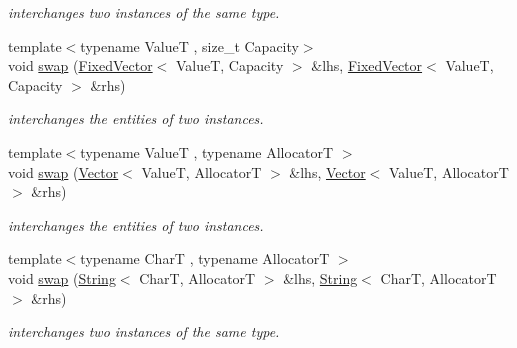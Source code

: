 \begin{DoxyCompactItemize}
\begin{DoxyCompactList}\small\item\em interchanges two instances of the same type. \end{DoxyCompactList}\item 
\hypertarget{namespacehryky_a0feb3a8be23701a830a3f21c9230dae8}{{\footnotesize template$<$typename Value\-T , size\-\_\-t Capacity$>$ }\\void \hyperlink{namespacehryky_a0feb3a8be23701a830a3f21c9230dae8}{swap} (\hyperlink{classhryky_1_1_fixed_vector}{Fixed\-Vector}$<$ Value\-T, Capacity $>$ \&lhs, \hyperlink{classhryky_1_1_fixed_vector}{Fixed\-Vector}$<$ Value\-T, Capacity $>$ \&rhs)}\label{namespacehryky_a0feb3a8be23701a830a3f21c9230dae8}

\begin{DoxyCompactList}\small\item\em interchanges the entities of two instances. \end{DoxyCompactList}\item 
\hypertarget{namespacehryky_af6bd1b171f155980bc887656187ae51d}{{\footnotesize template$<$typename Value\-T , typename Allocator\-T $>$ }\\void \hyperlink{namespacehryky_af6bd1b171f155980bc887656187ae51d}{swap} (\hyperlink{classhryky_1_1_vector}{Vector}$<$ Value\-T, Allocator\-T $>$ \&lhs, \hyperlink{classhryky_1_1_vector}{Vector}$<$ Value\-T, Allocator\-T $>$ \&rhs)}\label{namespacehryky_af6bd1b171f155980bc887656187ae51d}

\begin{DoxyCompactList}\small\item\em interchanges the entities of two instances. \end{DoxyCompactList}\item 
\hypertarget{namespacehryky_a600e415922f06a6098359a86c0055eea}{{\footnotesize template$<$typename Char\-T , typename Allocator\-T $>$ }\\void \hyperlink{namespacehryky_a600e415922f06a6098359a86c0055eea}{swap} (\hyperlink{classhryky_1_1_string}{String}$<$ Char\-T, Allocator\-T $>$ \&lhs, \hyperlink{classhryky_1_1_string}{String}$<$ Char\-T, Allocator\-T $>$ \&rhs)}\label{namespacehryky_a600e415922f06a6098359a86c0055eea}

\begin{DoxyCompactList}\small\item\em interchanges two instances of the same type. \end{DoxyCompactList}\end{DoxyCompactItemize}


